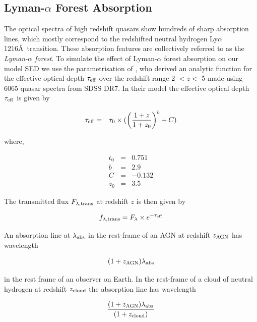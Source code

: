 \subsection{Lyman-$\alpha$ Forest Absorption}

The optical spectra of high redshift quasars show hundreds of sharp absorption lines, which mostly correspond to the redshifted neutral hydrogen Ly$\alpha$ 1216\AA~transition. These absorption features are collectively referred to as the {\it Lyman-$\alpha$ forest}. To simulate the effect of Lyman-$\alpha$ forest absorption on our model SED we use the parametrisation of \citet{becker13}, who derived an analytic function for the effective optical depth $\tau_{\rm eff}$ over the redshift range 2 $< z <$ 5 made using 6065 quasar spectra from SDSS DR7. In their model the effective optical depth $\tau_{\rm eff}$ is given by 

\begin{eqnarray}
  \label{eq:taueff}
  \tau_{\rm eff} & = & \tau_0 \times ( \left( \frac{ 1 + z }{ 1 + z_0 } \right)^b + C )
\end{eqnarray}

where,

\begin{eqnarray*}
  t_0 & = & 0.751 \\
  b & = & 2.9 \\
  C & = & -0.132 \\
  z_0 & = & 3.5 
\end{eqnarray*}

The transmitted flux $F_{\lambda,{\rm trans}}$ at redshift $z$ is then given by 

\begin{eqnarray}
  \label{eq:ftrans}
  f_{\lambda,{\rm trans}} = F_\lambda \times e^{ -\tau_{\rm eff} }
\end{eqnarray}

An absorption line at $\lambda_{\rm abs}$ in the rest-frame of an AGN at redshift $z_{\rm AGN}$ has wavelength 

\begin{eqnarray}
  (1 + z_{\rm AGN})\lambda_{\rm abs} 
\end{eqnarray}

in the rest frame of an observer on Earth. In the rest-frame of a cloud of neutral hydrogen at redshift $z_{\rm cloud}$ the absorption line has wavelength 

\begin{eqnarray}
  \frac{ (1 + z_{\rm AGN}) \lambda_{\rm abs} } { (1 + z_{\rm cloud}) }
\end{eqnarray}

